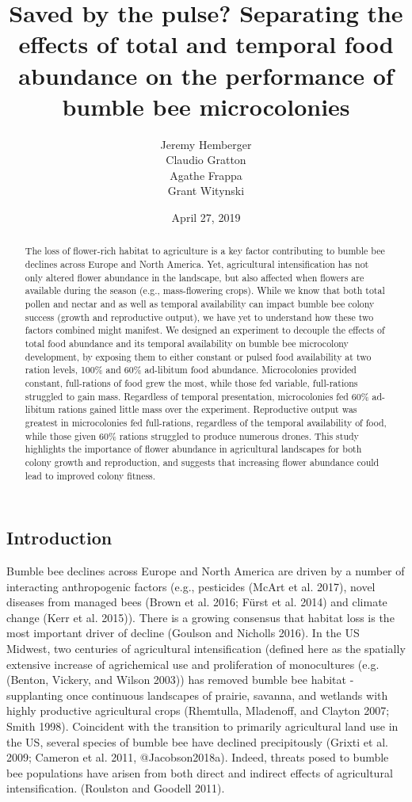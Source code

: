 \documentclass[11pt,]{article}
\title{Saved by the pulse? Separating the effects of total and temporal food
abundance on the performance of bumble bee microcolonies}
\author{Jeremy Hemberger \\ Claudio Gratton \\ Agathe Frappa \\ Grant Witynski}
\date{April 27, 2019}
\begin{document}
\maketitle
\begin{abstract}
The loss of flower-rich habitat to agriculture is a key factor
contributing to bumble bee declines across Europe and North America.
Yet, agricultural intensification has not only altered flower abundance
in the landscape, but also affected when flowers are available during
the season (e.g., mass-flowering crops). While we know that both total
pollen and nectar and as well as temporal availability can impact bumble
bee colony success (growth and reproductive output), we have yet to
understand how these two factors combined might manifest. We designed an
experiment to decouple the effects of total food abundance and its
temporal availability on bumble bee microcolony development, by exposing
them to either constant or pulsed food availability at two ration
levels, 100\% and 60\% ad-libitum food abundance. Microcolonies provided
constant, full-rations of food grew the most, while those fed variable,
full-rations struggled to gain mass. Regardless of temporal
presentation, microcolonies fed 60\% ad-libitum rations gained little
mass over the experiment. Reproductive output was greatest in
microcolonies fed full-rations, regardless of the temporal availability
of food, while those given 60\% rations struggled to produce numerous
drones. This study highlights the importance of flower abundance in
agricultural landscapes for both colony growth and reproduction, and
suggests that increasing flower abundance could lead to improved colony
fitness.
\end{abstract}

\hypertarget{introduction}{%
\subsection{Introduction}\label{introduction}}

Bumble bee declines across Europe and North America are driven by a
number of interacting anthropogenic factors (e.g., pesticides (McArt et
al. 2017), novel diseases from managed bees (Brown et al. 2016; Fürst et
al. 2014) and climate change (Kerr et al. 2015)). There is a growing
consensus that habitat loss is the most important driver of decline
(Goulson and Nicholls 2016). In the US Midwest, two centuries of
agricultural intensification (defined here as the spatially extensive
increase of agrichemical use and proliferation of monocultures
(e.g.(Benton, Vickery, and Wilson 2003)) has removed bumble bee habitat
- supplanting once continuous landscapes of prairie, savanna, and
wetlands with highly productive agricultural crops (Rhemtulla,
Mladenoff, and Clayton 2007; Smith 1998). Coincident with the transition
to primarily agricultural land use in the US, several species of bumble
bee have declined precipitously (Grixti et al. 2009; Cameron et al.
2011, @Jacobson2018a). Indeed, threats posed to bumble bee populations
have arisen from both direct and indirect effects of agricultural
intensification. (Roulston and Goodell 2011).
\end{document}
